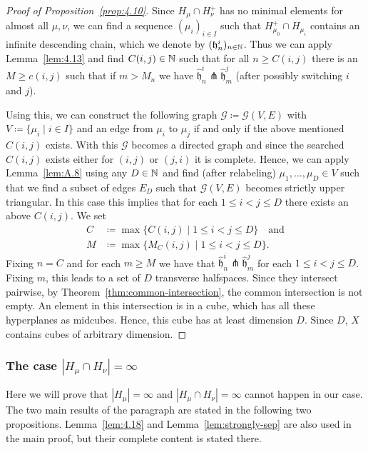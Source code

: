 \begin{proof}[Proof of Proposition~\ref{prop:4.10}]
  Since \(H_\mu \cap H_\nu^+\) has no minimal elements for almost all \(\mu, \nu\), we can find a sequence \((\mu_i)_{i \in I}\) such that \(H_{\mu_0}^+ \cap H_{\mu_i}\) contains an infinite descending chain, which we denote by \((\mathfrak{h}^i_n)_{n \in \mathbb{N}}\). Thus we can apply Lemma~\ref{lem:4.13} and find \(C(i,j) \in \mathbb{N}\) such that for all \(n \geq C(i,j)\) there is an \(M \geq c(i,j)\) such that if \(m > M_n\) we have \(\mathfrak{\hat h}_n^i \pitchfork \mathfrak{\hat h}_m^j\) (after possibly switching \(i\) and \(j\)).

  Using this, we can construct the following graph \(\mathcal{G} \coloneqq \mathcal{G}(V,E)\) with \(V \coloneqq \{\mu_i \mid i \in I\}\) and an edge from \(\mu_i\) to \(\mu_j\) if and only if the above mentioned \(C(i,j)\) exists. With this \(\mathcal{G}\) becomes a directed graph and since the searched \(C(i,j)\) exists either for \((i,j)\) or \((j,i)\) it is complete. Hence, we can apply Lemma~\ref{lem:A.8} using any \(D \in \mathbb{N}\) and find (after relabeling) \(\mu_1, \dots, \mu_D \in V\) such that we find a subset of edges \(E_D\) such that \(\mathcal{G}(V,E)\) becomes strictly upper triangular. In this case this implies that for each \(1\leq i < j \leq D\) there exists an above \(C(i,j)\). We set
  \begin{align*}
    C &\coloneqq \max\{C(i,j) \mid 1 \leq i < j \leq D\} \quad \text{and}\\
    M &\coloneqq \max\{M_C(i,j) \mid 1 \leq i < j \leq D\}.
  \end{align*}
  Fixing \(n = C\) and for each \(m \geq M\) we have that \(\mathfrak{\hat h}_n^i \pitchfork \mathfrak{\hat h}_m^j\) for each \(1 \leq i < j \leq D\). Fixing \(m\), this leads to a set of \(D\) transverse halfspaces. Since they intersect pairwise,  by Theorem~\ref{thm:common-intersection}, the common intersection is not empty. An element in this intersection is in a cube, which has all these hyperplanes as midcubes. Hence, this cube has at least dimension \(D\). Since \(D\), \(X\) contains cubes of arbitrary dimension.
\end{proof}

\subsubsection{The case \(|H_\mu \cap H_\nu| = \infty\)}
\label{sec:M=infty}

Here we will prove that \(|H_\mu| = \infty\) and \(|H_\mu \cap H_\nu| = \infty\) cannot happen in our case. The two main results of the paragraph are stated in the following two propositions. Lemma~\ref{lem:4.18} and Lemma~\ref{lem:strongly-sep} are also used in the main proof, but their complete content is stated there.

